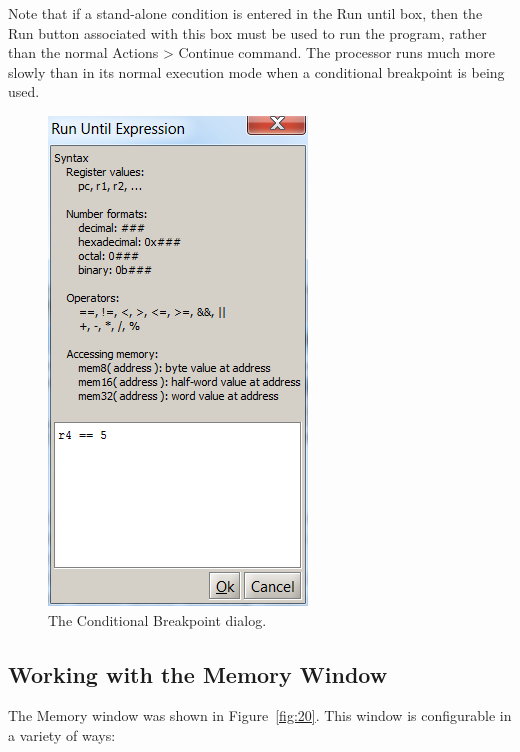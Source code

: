 \documentclass[11pt, twoside, pdftex]{article}
\begin{document}
Note that if a stand-alone condition is entered in the
{\sf Run until} box, then the Run button associated with this box must be used to run the
program, rather than the normal {\sf Actions > Continue} command.  
The processor runs much more slowly than in its normal execution
mode when a conditional breakpoint is being used.

\begin{figure}[H]
   \begin{center}
      \includegraphics[scale=0.8]{screenshots/figure39.png}
   \end{center}
   \caption{The Conditional Breakpoint dialog.} 
	 \label{fig:39}
\end{figure}


\subsection{Working with the Memory Window}

The Memory window was shown in Figure~\ref{fig:20}. This window is
configurable in a variety of ways:
\end{document}
